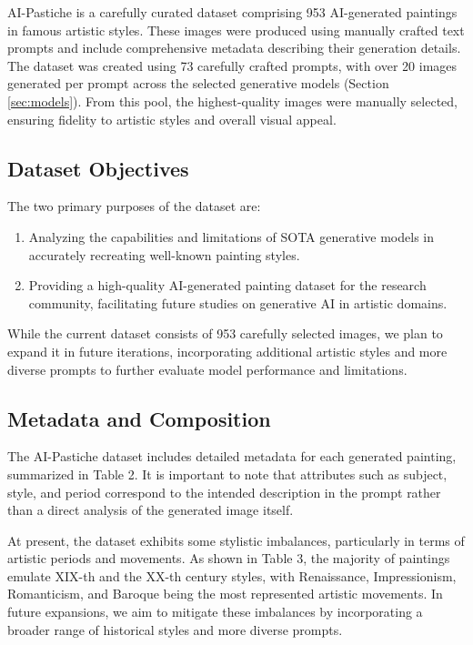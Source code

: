 \documentclass[sn-mathphys]{sn-jnl}
\begin{document}
AI-Pastiche is a carefully curated dataset comprising 953 AI-generated paintings in famous artistic styles. These images were produced using manually crafted text prompts and include comprehensive metadata describing their generation details. The dataset was created using 73 carefully crafted prompts, with over 20 images generated per prompt across the selected generative models (Section \ref{sec:models}). From this pool, the highest-quality images were manually selected, ensuring fidelity to artistic styles and overall visual appeal.

\subsection{Dataset Objectives}
The two primary purposes of the dataset are:

\begin{enumerate}
\item Analyzing the capabilities and limitations of SOTA generative models in accurately recreating well-known painting styles.
\item Providing a high-quality AI-generated painting dataset for the research community, facilitating future studies on generative AI in artistic domains.
\end{enumerate}

While the current dataset consists of 953 carefully selected images, we plan to expand it in future iterations, incorporating additional artistic styles and more diverse prompts to further evaluate model performance and limitations.

\subsection{Metadata and Composition}
\label{sec:metadata}
The AI-Pastiche dataset includes detailed metadata for each generated painting, summarized in Table 2. It is important to note that attributes such as subject, style, and period correspond to the intended description in the prompt rather than a direct analysis of the generated image itself.

At present, the dataset exhibits some stylistic imbalances, particularly in terms of artistic periods and movements. As shown in Table 3, the majority of paintings emulate XIX-th and the XX-th century styles, with Renaissance, Impressionism, Romanticism, and Baroque being the most represented artistic movements. In future expansions, we aim to mitigate these imbalances by incorporating a broader range of historical styles and more diverse prompts.
\end{document}
